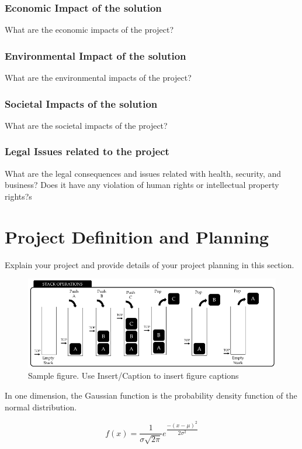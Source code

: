 \documentclass{mefsdp}
\begin{document}
	\subsubsection{Economic Impact of the solution}
	What are the economic impacts of the project? 
	
	\subsubsection{Environmental Impact of the solution}
	What are the environmental impacts of the project?
	
	\subsubsection{Societal Impacts of the solution}
	What are the societal impacts of the project?
	
	\subsubsection{Legal Issues related to the project}
	What are the legal consequences and issues related with health, security, and business? Does it have any violation of human rights or intellectual property rights?s
	
	\section{Project Definition and Planning}
	Explain your project and provide details of your project planning in this section.
	\begin{figure}[h]
		\includegraphics[scale=1]{../figures/sample_figure}
		\caption[First sample figure]{Sample figure. Use Insert/Caption to insert figure captions}
	\end{figure}

	In one dimension, the Gaussian function is the probability density function of the normal distribution. 
	
	\begin{equation}
		f(x) = \frac{1}{\sigma\sqrt{2\pi}}e^{\dfrac{-(x-\mu)^2}{2\sigma^2}}
	\end{equation}
	
\end{document}
